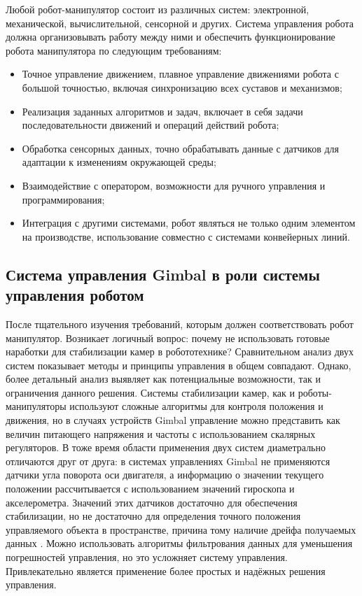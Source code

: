 Любой робот-манипулятор состоит из различных систем: электронной, механической, вычислительной, сенсорной и других. Система управления робота должна организовывать работу между ними и обеспечить функционирование робота манипулятора по следующим требованиям:
\begin{itemize}
	\item Точное управление движением, плавное управление движениями робота с
	      большой точностью, включая синхронизацию всех суставов и механизмов;

	\item Реализация заданных алгоритмов и задач, включает в себя задачи
	      последовательности движений и операций действий робота;

	\item Обработка сенсорных данных, точно обрабатывать данные с датчиков для
	      адаптации к изменениям окружающей среды;

	\item Взаимодействие с оператором, возможности для ручного управления и
	      программирования;

	\item Интеграция с другими системами, робот являться не только одним
	      элементом на производстве, использование совместно с системами конвейерных
	      линий.
\end{itemize}

\subsection{Система управления Gimbal в роли системы управления роботом}

После тщательного изучения требований, которым должен соответствовать робот манипулятор. Возникает логичный вопрос: почему не использовать готовые наработки для стабилизации камер в робототехнике? Сравнительном анализ двух систем показывает методы и принципы управления в общем совпадают. Однако, более детальный анализ выявляет как потенциальные возможности, так и ограничения данного решения. Системы стабилизации камер, как и роботы-манипуляторы используют сложные алгоритмы для контроля положения и движения, но в случаях устройств Gimbal управление можно представить как величин питающего напряжения и частоты с использованием скалярных регуляторов. \citep{Altan2020} В тоже время области применения двух систем диаметрально отличаются друг от друга: в системах управлениях Gimbal не применяются датчики угла поворота оси двигателя, а информацию о значении текущего положении рассчитывается с использованием значений гироскопа и акселерометра. Значений этих датчиков достаточно для обеспечения стабилизации, но не достаточно для определения точного положения управляемого объекта в пространстве, причина тому наличие дрейфа получаемых данных \citep{1223234}.  Можно использовать алгоритмы фильтрования данных для уменьшения погрешностей управления, но это усложняет систему управления. Привлекательно является применение более простых и надёжных решения управления.

